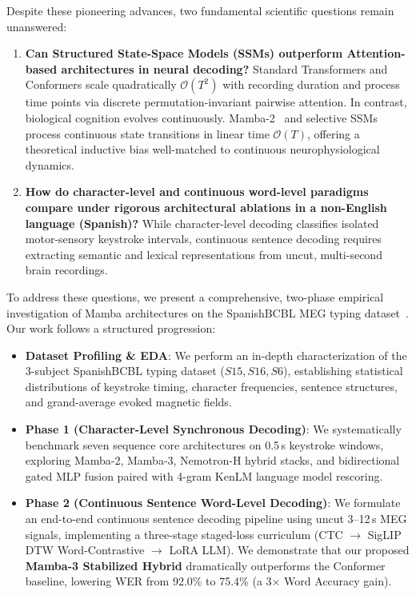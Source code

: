 \documentclass[conference]{IEEEtran}
\begin{document}
Despite these pioneering advances, two fundamental scientific questions remain unanswered:
\begin{enumerate}
    \item \textbf{Can Structured State-Space Models (SSMs) outperform Attention-based architectures in neural decoding?} Standard Transformers and Conformers scale quadratically $\mathcal{O}(T^2)$ with recording duration and process time points via discrete permutation-invariant pairwise attention. In contrast, biological cognition evolves continuously. Mamba-2~\cite{mamba2} and selective SSMs process continuous state transitions in linear time $\mathcal{O}(T)$, offering a theoretical inductive bias well-matched to continuous neurophysiological dynamics.
    \item \textbf{How do character-level and continuous word-level paradigms compare under rigorous architectural ablations in a non-English language (Spanish)?} While character-level decoding classifies isolated motor-sensory keystroke intervals, continuous sentence decoding requires extracting semantic and lexical representations from uncut, multi-second brain recordings.
\end{enumerate}

To address these questions, we present a comprehensive, two-phase empirical investigation of Mamba architectures on the SpanishBCBL MEG typing dataset~\cite{spanishbcbl}. Our work follows a structured progression:
\begin{itemize}
    \item \textbf{Dataset Profiling \& EDA}: We perform an in-depth characterization of the 3-subject SpanishBCBL typing dataset ($S15, S16, S6$), establishing statistical distributions of keystroke timing, character frequencies, sentence structures, and grand-average evoked magnetic fields.
    \item \textbf{Phase 1 (Character-Level Synchronous Decoding)}: We systematically benchmark seven sequence core architectures on 0.5\,s keystroke windows, exploring Mamba-2, Mamba-3, Nemotron-H hybrid stacks, and bidirectional gated MLP fusion paired with 4-gram KenLM language model rescoring.
    \item \textbf{Phase 2 (Continuous Sentence Word-Level Decoding)}: We formulate an end-to-end continuous sentence decoding pipeline using uncut 3--12\,s MEG signals, implementing a three-stage staged-loss curriculum (CTC $\to$ SigLIP DTW Word-Contrastive $\to$ LoRA LLM). We demonstrate that our proposed \textbf{Mamba-3 Stabilized Hybrid} dramatically outperforms the Conformer baseline, lowering WER from 92.0\% to 75.4\% (a 3$\times$ Word Accuracy gain).
\end{itemize}
\end{document}
